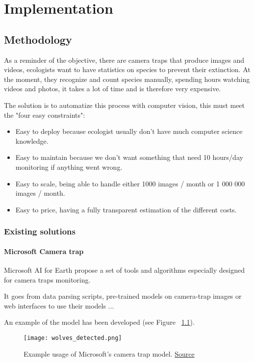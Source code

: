 \chapter{Implementation}
\section{Methodology}

As a reminder of the objective, there are camera traps that produce images and videos, ecologists want to have statistics on species to prevent their extinction.
At the moment, they recognize and count species manually, spending hours watching videos and photos, it takes a lot of time and is therefore very expensive.

The solution is to automatize this process with computer vision, this must meet the "four easy constraints":
\begin{itemize}
    \item Easy to deploy because ecologist usually don't have much computer science knowledge.
    \item Easy to maintain because we don't want something that need 10 hours/day monitoring if anything went wrong.
    \item Easy to scale, being able to handle either 1000 images / month or 1 000 000 images / month.
    \item Easy to price, having a fully transparent estimation of the different costs.
\end{itemize}

\pagebreak\subsection{Existing solutions}
\subsubsection{Microsoft Camera trap}
Microsoft AI for Earth propose a set of tools and algorithms especially designed for camera traps monitoring\cite{microsoft_camera_trap}.

It goes from data parsing scripts, pre-trained models on camera-trap images or web interfaces to use their models ...

An example of the model has been developed (see Figure ~\ref{fig:microsoftcamtrap}).

\begin{figure}[H]
\centering
\texttt{[image: wolves\_detected.png]}
\caption{Example usage of Microsoft's camera trap model. \href{https://gist.github.com/louis030195/b64ba5a839c46c2ab0bf9451477a97df}{Source}}
\label{fig:microsoftcamtrap}
\end{figure}

